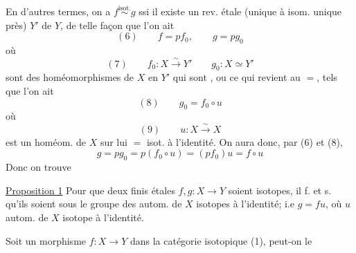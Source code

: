 En d'autres termes, on a $f\overset{\mathrm{isot.}}{\sim}g$ ssi il existe un rev.  étale (unique à isom. unique près) $Y'$ de $Y$, de telle façon que l'on ait
\[
(6)\qquad f=pf_0,\qquad g=pg_0
\]
où
\[
(7)\qquad f_0:X\xrightarrow{\sim}Y'\qquad g_0:X\simeq Y'
\]
sont des homéomorphismes de $X$ en $Y'$ qui sont , ou ce qui revient au $=$, tels que l'on ait
\[
(8)\qquad g_0=f_0\circ u
\]
où
\[
(9)\qquad u:X\xrightarrow{\sim}X
\]
 est un homéom. de $X$ sur lui $=$ isot. à l'identité. On aura donc, par (6) et (8),
\[
g=pg_0=p(f_0\circ u)=(pf_0)u=f\circ u
\]
Donc on trouve

\uline{Proposition 1} Pour que deux   finis étales $f,g:X\longrightarrow Y$ soient isotopes, il f. et s. qu'ils soient  sous le groupe des autom. de $X$ isotopes à l'identité; i.e $g=fu$, où $u$ autom. de $X$ isotope à l'identité.

Soit un  morphisme $f:X\longrightarrow Y$ dans la catégorie isotopique (1), peut-on le
